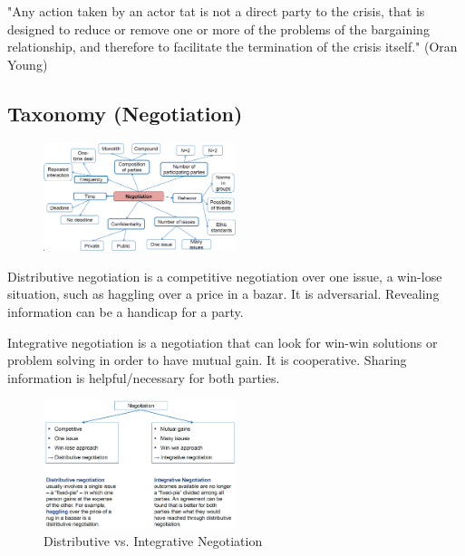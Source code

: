 \begin{definition}[Mediation]
    "Any action taken by an actor tat is not a direct party to the crisis, that is
    designed to reduce or remove one or more of the problems of the bargaining
    relationship, and therefore to facilitate the termination of the crisis itself."
    (Oran Young)
\end{definition}

\subsection{Taxonomy (Negotiation)}

\begin{figure}[h]
    \centering
    \includegraphics[width=0.5\textwidth]{Pictures/Taxonomy_General.png}
    \label{fig:Taxonomy_General}
\end{figure}

\begin{definition}
    Distributive negotiation is a competitive negotiation over one issue, a win-lose
    situation, such as haggling over a price in a bazar. It is adversarial.
    Revealing information can be a handicap for a party.
\end{definition}

\begin{definition}
    Integrative negotiation is a negotiation that can look for win-win solutions
    or problem solving in order to have mutual gain. It is cooperative. Sharing
    information is helpful/necessary for both parties.
\end{definition}

\begin{figure}[H]
    \centering
    \includegraphics[width=0.5\textwidth]{Pictures/Distributive_vs_Integrative_Negotiation.png}
    \caption{Distributive vs. Integrative Negotiation}
    \label{Distributive_vs_Integrative_Negotiation}
\end{figure}

